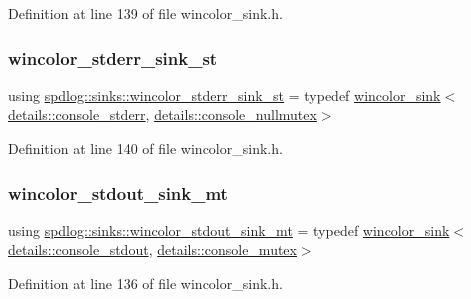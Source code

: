 Definition at line 139 of file wincolor\+\_\+sink.\+h.

\mbox{\label{namespacespdlog_1_1sinks_a23305ec4888b5d6d70335c0ae86b2b05}} 
\subsubsection{\texorpdfstring{wincolor\+\_\+stderr\+\_\+sink\+\_\+st}{wincolor\_stderr\_sink\_st}}
{\footnotesize\ttfamily using \hyperlink{namespacespdlog_1_1sinks_a23305ec4888b5d6d70335c0ae86b2b05}{spdlog\+::sinks\+::wincolor\+\_\+stderr\+\_\+sink\+\_\+st} = typedef \hyperlink{classspdlog_1_1sinks_1_1wincolor__sink}{wincolor\+\_\+sink}$<$\hyperlink{structspdlog_1_1details_1_1console__stderr}{details\+::console\+\_\+stderr}, \hyperlink{structspdlog_1_1details_1_1console__nullmutex}{details\+::console\+\_\+nullmutex}$>$}



Definition at line 140 of file wincolor\+\_\+sink.\+h.

\mbox{\label{namespacespdlog_1_1sinks_a93242506c736c358ca4ef36286dedb41}} 
\subsubsection{\texorpdfstring{wincolor\+\_\+stdout\+\_\+sink\+\_\+mt}{wincolor\_stdout\_sink\_mt}}
{\footnotesize\ttfamily using \hyperlink{namespacespdlog_1_1sinks_a93242506c736c358ca4ef36286dedb41}{spdlog\+::sinks\+::wincolor\+\_\+stdout\+\_\+sink\+\_\+mt} = typedef \hyperlink{classspdlog_1_1sinks_1_1wincolor__sink}{wincolor\+\_\+sink}$<$\hyperlink{structspdlog_1_1details_1_1console__stdout}{details\+::console\+\_\+stdout}, \hyperlink{structspdlog_1_1details_1_1console__mutex}{details\+::console\+\_\+mutex}$>$}



Definition at line 136 of file wincolor\+\_\+sink.\+h.

